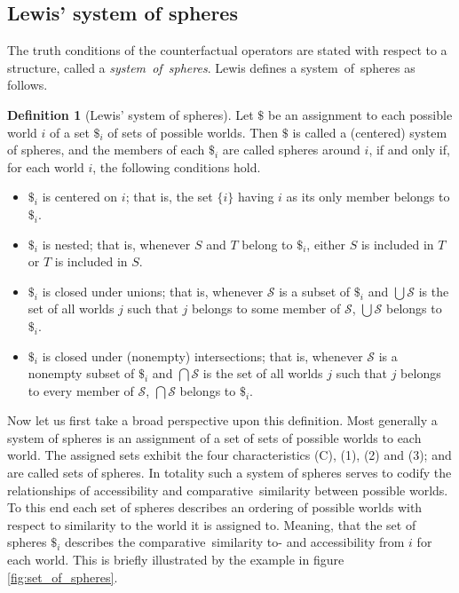 \documentclass[a4paper,american,10pt]{paper}
\theoremstyle{definition}\newtheorem{lemma}[thm]{Lemma}
\theoremstyle{definition}\newtheorem{proposition}[thm]{Proposition}
\theoremstyle{definition}\newtheorem{corollary}[thm]{Corollary}
\theoremstyle{definition}\newtheorem{definition}{Definition}
\begin{document}
\subsection{Lewis' system of spheres}
The truth conditions of the counterfactual operators are stated with respect to a structure, called a \textit{system~of~spheres}. Lewis defines a system~of~spheres as follows.
\begin{definition}[Lewis' system of spheres]
Let $\$$ be an assignment to each possible world $i$ of a set $\$_i$ of sets of possible worlds. Then $\$$ is called a (centered) system of spheres, and the members of each $\$_i$ are called spheres around $i$, if and only if, for each world $i$, the following conditions hold.
	\begin{itemize}
	\item[(C)] $\$_i$ is centered on $i$; that is, the set $\{i\}$ having $i$ as its only member belongs to $\$_i$.
	\item[(1)] $\$_i$ is nested; that is, whenever $S$ and $T$ belong to $\$_i$, either $S$ is included in $T$ or $T$ is included in $S$.
	\item[(2)] $\$_i$ is closed under unions; that is, whenever $\mathscr{S}$ is a subset of $\$_i$ and $\bigcup\mathscr{S}$ is the set of all worlds $j$ such that $j$ belongs to some member of $\mathscr{S}$, $\bigcup\mathscr{S}$ belongs to $\$_i$.
	\item[(3)] $\$_i$ is closed under (nonempty) intersections; that is, whenever $\mathscr{S}$ is a nonempty subset of $\$_i$ and $\bigcap\mathscr{S}$ is the set of all worlds $j$ such that $j$ belongs to every member of $\mathscr{S}$, $\bigcap\mathscr{S}$ belongs to $\$_i$.
	\end{itemize}
	\label{def:system_of_spheres}
\end{definition}
\noindent Now let us first take a broad perspective upon this definition. Most generally a system of spheres is an assignment of a set of sets of possible worlds to each world. The assigned sets exhibit the four characteristics (C), (1), (2) and (3); and are called sets of spheres. In totality such a system of spheres serves to codify the relationships of accessibility and comparative~similarity between possible worlds. To this end each set of spheres describes an ordering of possible worlds with respect to similarity to the world it is assigned to. Meaning, that the set of spheres $\$_i$ describes the comparative~similarity to- and accessibility from $i$ for each world. This is briefly illustrated by the example in figure \ref{fig:set_of_spheres}.
\end{document}
